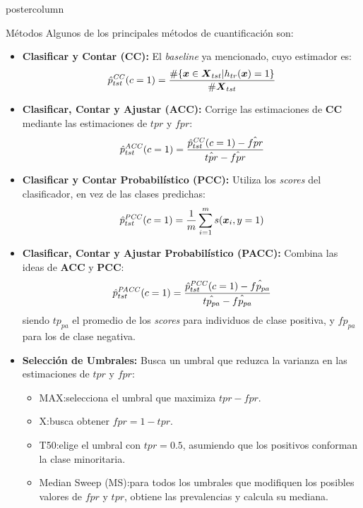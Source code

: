 \documentclass{beamer}
\begin{document}
\begin{frame}
\begin{columns}
\begin{column}{.57\textwidth}
\begin{beamercolorbox}[center]{postercolumn}
\begin{minipage}{.98\textwidth}
{					\begin{myblock}{Métodos}
						Algunos de los principales métodos de cuantificación son:
						\begin{itemize}
							\item \textbf{Clasificar y Contar (CC):} El {\it baseline\/} ya mencionado, cuyo estimador es: 
							\begin{equation}
								\hat p^{\it{CC}}_{tst}(c=1) = \frac{\#\{\boldsymbol{x} \in \boldsymbol{X}_{tst}|h_{tr}(\boldsymbol{x})=1\}}{\#\boldsymbol{X}_{tst}}
							\end{equation}
							\item \textbf{Clasificar, Contar y Ajustar (ACC):} Corrige las estimaciones de \textbf{CC} mediante las estimaciones de
							$tpr$ y $fpr$:
							\begin{equation}
								\hat p^{\it{ACC}}_{tst}(c=1) = \frac{\hat p^{\it{CC}}_{tst}(c=1)-\hat {fpr}}{\hat {tpr}-\hat {fpr}}
							\end{equation}
							\item \textbf{Clasificar y Contar Probabilístico (PCC):} Utiliza los {\it scores\/} del clasificador, en vez de las clases predichas:
							\begin{equation}
								\hat p^{\it{PCC}}_{tst}(c=1) = \frac{1}{m} \sum \limits_{i=1}^{m}{s(\boldsymbol{x}_i, y=1)}
							\end{equation}
							\item \textbf{Clasificar, Contar y Ajustar Probabilístico (PACC):} Combina las ideas de \textbf{ACC} y \textbf{PCC}:
							\begin{equation}
								\hat p^{\it{PACC}}_{tst}(c=1) = \frac{\hat p^{\it{PCC}}_{tst}(c=1)-\hat {fp_{pa}}}{\hat {tp_{pa}} - \hat {fp_{pa}}}
							\end{equation}
							siendo $tp_{pa}$ el promedio de los {\it scores\/} para individuos de clase positiva, y $fp_{pa}$ para los de clase negativa.
							\item \textbf{Selección de Umbrales:} Busca un umbral que reduzca la
							varianza en las estimaciones de $tpr$ y $fpr$:
							\begin{itemize}
								\item MAX:\@ selecciona el umbral que maximiza $tpr-fpr$.
								\item X:\@ busca obtener $fpr=1-tpr$.
								\item T50:\@ elige el umbral con $tpr=0.5$, asumiendo que los positivos
								conforman la clase minoritaria.
								\item Median Sweep (MS):\@ para todos los umbrales que modifiquen los posibles valores de
								$fpr$ y $tpr$, obtiene las prevalencias y calcula su mediana.
							\end{itemize}
						\end{itemize}
					\end{myblock}\vfill

}
\end{minipage}
\end{beamercolorbox}
\end{column}
\end{columns}
\end{frame}
\end{document}
